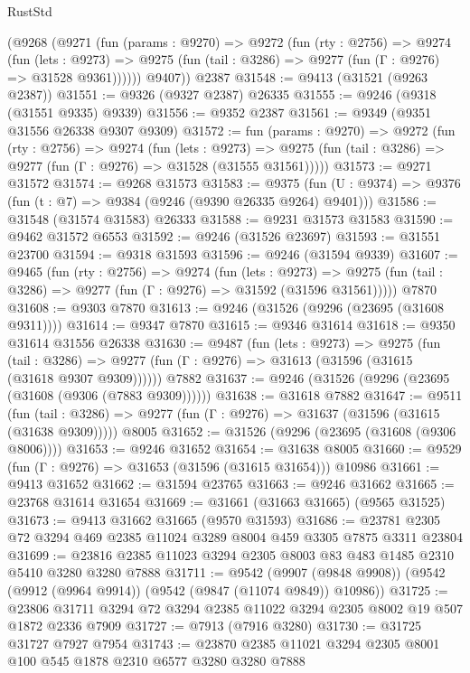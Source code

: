 \begin{lexlean}{RustStd}
\begin{coremodule}
      (@9268
        (@9271
          (fun (params : @9270) =>
          @9272
            (fun (rty : @2756) =>
            @9274
              (fun (lets : @9273) =>
              @9275 (fun (tail : @3286) => @9277 (fun (Γ : @9276) => @31528 @9361))))))
        @9407))
    @2387
@31548 := @9413 (@31521 (@9263 @2387))
@31551 := @9326 (@9327 @2387) @26335
@31555 := @9246 (@9318 (@31551 @9335) @9339)
@31556 := @9352 @2387
@31561 := @9349 (@9351 @31556 @26338 @9307 @9309)
@31572 := fun (params : @9270) =>
  @9272
    (fun (rty : @2756) =>
    @9274
      (fun (lets : @9273) =>
      @9275 (fun (tail : @3286) => @9277 (fun (Γ : @9276) => @31528 (@31555 @31561)))))
@31573 := @9271 @31572
@31574 := @9268 @31573
@31583 := @9375
    (fun (U : @9374) => @9376 (fun (t : @7) => @9384 (@9246 (@9390 @26335 @9264) @9401)))
@31586 := @31548 (@31574 @31583) @26333
@31588 := @9231 @31573 @31583
@31590 := @9462 @31572 @6553
@31592 := @9246 (@31526 @23697)
@31593 := @31551 @23700
@31594 := @9318 @31593
@31596 := @9246 (@31594 @9339)
@31607 := @9465
    (fun (rty : @2756) =>
    @9274
      (fun (lets : @9273) =>
      @9275 (fun (tail : @3286) => @9277 (fun (Γ : @9276) => @31592 (@31596 @31561)))))
    @7870
@31608 := @9303 @7870
@31613 := @9246 (@31526 (@9296 (@23695 (@31608 @9311))))
@31614 := @9347 @7870
@31615 := @9346 @31614
@31618 := @9350 @31614 @31556 @26338
@31630 := @9487
    (fun (lets : @9273) =>
    @9275
      (fun (tail : @3286) =>
      @9277 (fun (Γ : @9276) => @31613 (@31596 (@31615 (@31618 @9307 @9309))))))
    @7882
@31637 := @9246 (@31526 (@9296 (@23695 (@31608 (@9306 (@7883 @9309))))))
@31638 := @31618 @7882
@31647 := @9511
    (fun (tail : @3286) => @9277 (fun (Γ : @9276) => @31637 (@31596 (@31615 (@31638 @9309)))))
    @8005
@31652 := @31526 (@9296 (@23695 (@31608 (@9306 @8006))))
@31653 := @9246 @31652
@31654 := @31638 @8005
@31660 := @9529 (fun (Γ : @9276) => @31653 (@31596 (@31615 @31654))) @10986
@31661 := @9413 @31652
@31662 := @31594 @23765
@31663 := @9246 @31662
@31665 := @23768 @31614 @31654
@31669 := @31661 (@31663 @31665) (@9565 @31525)
@31673 := @9413 @31662 @31665 (@9570 @31593)
@31686 := @23781 @2305 @72 @3294 @469 @2385 @11024 @3289 @8004 @459 @3305 @7875 @3311 @23804
@31699 := @23816 @2385 @11023 @3294 @2305 @8003 @83 @483 @1485 @2310 @5410 @3280 @3280 @7888
@31711 := @9542
    (@9907 (@9848 @9908))
    (@9542 (@9912 (@9964 @9914)) (@9542 (@9847 (@11074 @9849)) @10986))
@31725 := @23806 @31711 @3294 @72 @3294 @2385 @11022 @3294 @2305 @8002 @19 @507 @1872 @2336 @7909
@31727 := @7913 (@7916 @3280)
@31730 := @31725 @31727 @7927 @7954
@31743 := @23870 @2385 @11021 @3294 @2305 @8001 @100 @545 @1878 @2310 @6577 @3280 @3280 @7888

\end{coremodule}
\end{lexlean}
